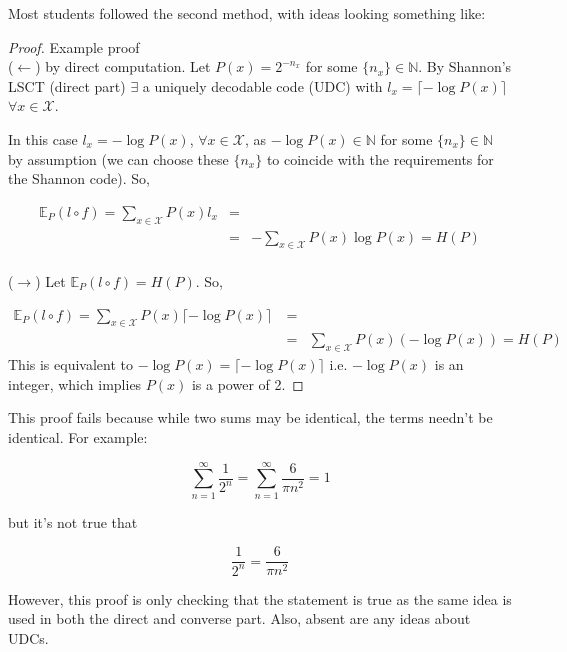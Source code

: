 \documentclass[11pt]{article}
\begin{document}
Most students followed the second method, with ideas looking something like:
\begin{proof}{Example proof}
\\
(\(\leftarrow\)) by direct computation. Let \(P\left(x\right) = 2^{-n_x}\) for some \(\{n_x\} \in \mathbb{N}\). By Shannon's LSCT (direct part) \(\exists\) a uniquely decodable code (UDC) with \(l_x = \lceil -\log{P\left(x\right)}\rceil\) \(\forall x \in \mathcal{X}\). 

In this case \(l_x = -\log{P\left(x\right)}\), \(\forall x \in \mathcal{X}\), as \(-\log{P\left(x\right)} \in \mathbb{N}\) for some \(\{n_x\} \in \mathbb{N}\) by assumption (we can choose these \(\{n_x\}\) to coincide with the requirements for the Shannon code). So,

\begin{align}
\mathbb{E}_P \left( l \circ f \right) = \sum_{x \in \mathcal{X}} P\left(x\right)l_x &=& \\
&=& - \sum_{x \in \mathcal{X}} P\left(x\right) \log{P\left(x\right)} = H\left(P\right)
\end{align}
\\
(\(\rightarrow\)) Let \(\mathbb{E}_P \left( l \circ f \right)  = H\left(P\right)\). So,

\begin{align}
\mathbb{E}_P \left( l \circ f \right) = \sum_{x \in \mathcal{X}} P\left(x\right)\lceil -\log{P\left(x\right)}\rceil\ &=& \\
&=&  \sum_{x \in \mathcal{X}} P\left(x\right) \left(-\log{P\left(x\right)}\right) = H\left(P\right)
\end{align}
This is equivalent to \(-\log{P\left(x\right)} = \lceil -\log{P\left(x\right)} \rceil \) i.e. \(-\log{P\left(x\right)}\) is an integer, which implies \(P\left(x\right)\) is a power of 2.
\end{proof}
This proof fails because while two sums may be identical, the terms needn't be identical. For example:

\begin{equation}
\sum_{n=1}^\infty \frac{1}{2^n} = \sum_{n=1}^\infty \frac{6}{\pi n^2} = 1
\end{equation}

but it's not true that

\begin{equation}
\frac{1}{2^n} = \frac{6}{\pi n^2}
\end{equation}

However, this proof is only checking that the statement is true as the same idea is used in both the direct and converse part. Also, absent are any ideas about UDCs.
\end{document}
